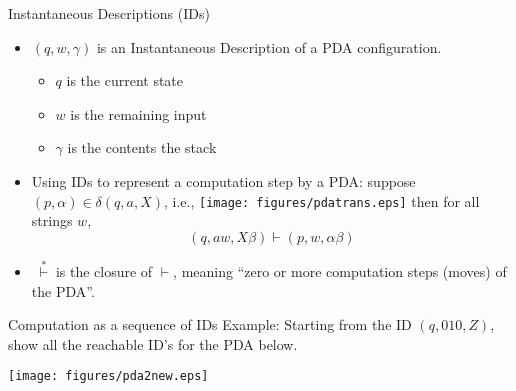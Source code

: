 \documentclass{prosper}%
\newcommand{\cvd}{\mbox{$\;\overset{*}{\vdash}\;$}}
\begin{document}
\begin{slide}{Instantaneous Descriptions (IDs)}
\begin{itemize}
\item $(q, w, \gamma)$ is an {\blue Instantaneous Description}  of a PDA  configuration.
\begin{itemize}
\item $q$ is the current state
\item $w$ is the remaining input
\item $\gamma$ is the contents the stack
\end{itemize}
\item Using IDs to represent a {\blue computation step by a PDA}: suppose $(p, \alpha)  \in \delta(q, a, X)$, i.e., \texttt{[image: figures/pdatrans.eps]} then for all strings $w$, \[(q, aw, X\beta)\vdash (p, w, \alpha \beta)\]

\item \cvd is the  closure of $\vdash$, meaning ``zero or more computation steps (moves) of the PDA''.

\end{itemize}
\end{slide}

\begin{slide}{Computation as a sequence of IDs}
Example: Starting from the ID $(q, 010, Z)$, show all the reachable ID's for the PDA below.
\begin{center}
\texttt{[image: figures/pda2new.eps]}
\end{center}
\end{slide}

\begin{comment}
\begin{slide}{Some properties of PDA}\label{sl:prop}
\begin{itemize}
\item If an ID sequence is a legal computation for a PDA, then so is the sequence obtained by adding an additional string to the second and/or third component. Formally: $\forall w \in\Sigma^*, \beta \in\Gamma^*$ :
\[
\mbox{if }(q, x, \mbox{\red \underline{$\alpha$}})\cvd(p, y, \mbox{\red \underline{$\beta$}}) \mbox{, then }(q, xw, \mbox{\red \underline{$\alpha\gamma$}} )\cvd(p, yw, \mbox{\red\underline{ $\beta\gamma$}})
\]
\item  If an ID sequence is a legal computation 
for a PDA, and some tail of the input is 
not consumed, then removing this tail from 
all ID's result in a legal computation sequence. 
\[
\mbox{if }(q, {\red\underline{ xw}}, \alpha)\cvd(p, {\red\underline{ yw}}, \beta)  \mbox{, then }(q, {\red \underline{x}}, \alpha )\cvd(p, {\red \underline{y}}, \beta)
\]
\end{itemize}
\end{slide}
\end{comment}
\end{document}
